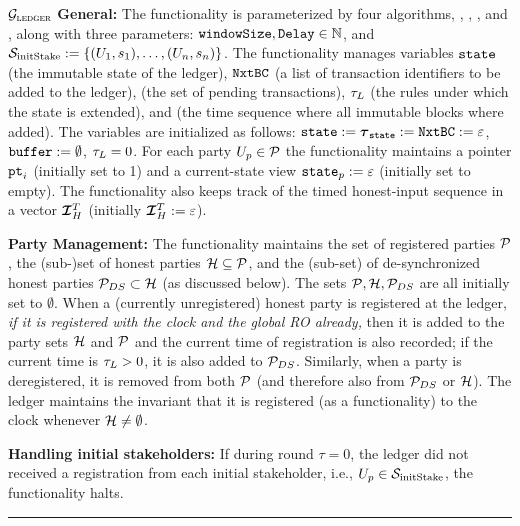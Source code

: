   \begin{systembox}{$\mathcal{G}_{\textsc{ledger}}$}\vspace{1ex}
    \small
    {\bf General:}
    The functionality is parameterized by four algorithms, \LFvalidate,
    \LFextend, \LFblockify, and \vsync, along with three parameters:
    $\texttt{windowSize}, \texttt{Delay}\in\mathbb{N}$, and $\mathcal{S}_\mathrm{initStake} :=
    \{(U_{1},s_{1}),\ldots,(U_{n},s_{n})\}$.
    The functionality manages variables $\texttt{state}$ (the immutable state of the
    ledger), $\texttt{NxtBC}$ (a list of transaction identifiers to be added to the
    ledger), \buffer (the set of pending transactions), $\tau_L$ (the rules
    under which the state is extended), and \tlast (the time sequence where all
    immutable blocks where added). The variables are initialized as follows:
    $\state:=\tlast:= \cbuffer:= \varepsilon$, $\texttt{buffer}:=\emptyset$, $\tau_L=0$.
    For each party ${U_p}\in\mathcal{P}$ the functionality maintains a pointer $\texttt{pt}_i$
    (initially set to 1) and a current-state view $\texttt{state}_p:=\varepsilon$
    (initially set to empty). The functionality also keeps track of the  timed
    honest-input sequence in a vector $\TIH$ (initially $\TIH:=\varepsilon$).
    \medskip

    {\bf Party Management:}
    The functionality maintains the set of registered parties $\mathcal{P}$, the
    (sub-)set of honest parties $\mathcal{H} \subseteq \mathcal{P}$, and the (sub-set) of
    de-synchronized honest parties $\mathcal{P}_{DS}\subset\mathcal{H}$ (as discussed below).
    The sets $\mathcal{P}, \mathcal{H}, \mathcal{P}_{DS}$ are all initially set to $\emptyset$. When a
    (currently unregistered) honest party is registered at the ledger, {\em if
    it is registered with the clock and the global RO already,} then it is added
    to the party sets $\mathcal{H}$ and $\mathcal{P}$ and the current time of registration is
    also recorded; if the current time is $\tau_L > 0$, it is also added to
    $\mathcal{P}_{DS}$. Similarly, when a party is deregistered, it is removed from both
    $\mathcal{P}$ (and therefore also from $\mathcal{P}_{DS}$ or $\mathcal{H}$). The ledger maintains
    the invariant that it is registered (as a functionality) to the clock
    whenever $\mathcal{H} \neq \emptyset$.

    \medskip

    {\bf Handling initial stakeholders:}
    If during round $\tau = 0$, the ledger did not received a registration from
    each initial stakeholder, i.e., ${U_p} \in \mathcal{S}_\mathrm{initStake}$, the
    functionality halts.

    \medskip
    \hrule
    \medskip


\end{systembox}
